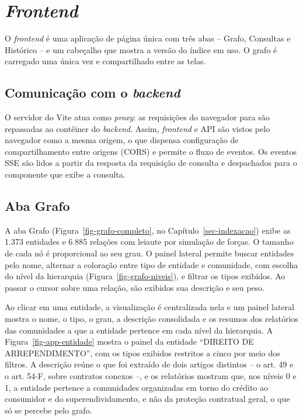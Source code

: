 \section{\textit{Frontend}}
\label{sec-aplicacao-frontend}

O \textit{frontend} é uma aplicação de página única com três abas -- Grafo, Consultas e Histórico -- e um cabeçalho que mostra a versão do índice em uso. O grafo é carregado uma única vez e compartilhado entre as telas.

\subsection{Comunicação com o \textit{backend}}
\label{sec-aplicacao-frontend-proxy}

O servidor do Vite atua como \textit{proxy}: as requisições do navegador para  são repassadas ao contêiner do \textit{backend}. Assim, \textit{frontend} e API são vistos pelo navegador como a mesma origem, o que dispensa configuração de compartilhamento entre origens (CORS) e permite o fluxo de eventos. Os eventos SSE são lidos a partir da resposta da requisição de consulta e despachados para o componente que exibe a consulta.

\subsection{Aba Grafo}
\label{sec-aplicacao-frontend-grafo}

A aba Grafo (Figura~\ref{fig-grafo-completo}, no Capítulo~\ref{sec-indexacao}) exibe as 1.373 entidades e 6.885 relações com leiaute por simulação de forças. O tamanho de cada nó é proporcional ao seu grau. O painel lateral permite buscar entidades pelo nome, alternar a coloração entre tipo de entidade e comunidade, com escolha do nível da hierarquia (Figura~\ref{fig-grafo-niveis}), e filtrar os tipos exibidos. Ao passar o cursor sobre uma relação, são exibidos sua descrição e seu peso.

Ao clicar em uma entidade, a visualização é centralizada nela e um painel lateral mostra o nome, o tipo, o grau, a descrição consolidada e os resumos dos relatórios das comunidades a que a entidade pertence em cada nível da hierarquia. A Figura~\ref{fig-app-entidade} mostra o painel da entidade ``DIREITO DE ARREPENDIMENTO'', com os tipos exibidos restritos a cinco por meio dos filtros. A descrição reúne o que foi extraído de dois artigos distintos -- o art. 49 e o art. 54-F, sobre contratos conexos --, e os relatórios mostram que, nos níveis 0 e 1, a entidade pertence a comunidades organizadas em torno do crédito ao consumidor e do superendividamento, e não da proteção contratual geral, o que só se percebe pelo grafo.

